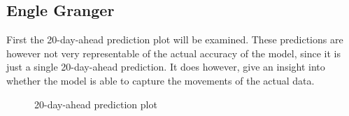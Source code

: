 \subsection{Engle Granger}
First the 20-day-ahead prediction plot will be examined. These predictions are however not very representable of the actual accuracy of the model, since it is just a single 20-day-ahead prediction. It does however, give an insight into whether the model is able to capture the movements of the actual data.
\begin{figure}[H]
  \centering
  \quad
  \caption{20-day-ahead prediction plot}
  \label{fig:SOL_ETH_20_DAY_plot}
\end{figure}
